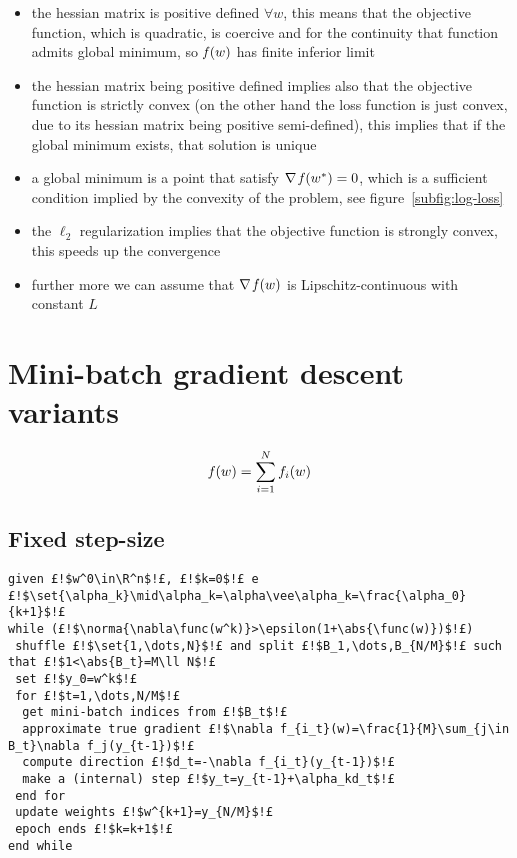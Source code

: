 \begin{itemize}
\item the hessian matrix is positive defined $\forall w$, this means that the objective function, which is quadratic, is coercive and for the continuity that function admits global minimum, so $\operatorname*{\mathit{f}}(w)$ has finite inferior limit
\item the hessian matrix being positive defined implies also that the objective function is strictly convex (on the other hand the loss function is just convex, due to its hessian matrix being positive semi-defined), this implies that if the global minimum exists, that solution is unique
\item a global minimum is a point that satisfy $\nabla\operatorname*{\mathit{f}}(w^\ast)=0$, which is a sufficient condition implied by the convexity of the problem, see figure~\vref{subfig:log-loss}
\item the $\ell_2$ regularization implies that the objective function is strongly convex, this speeds up the convergence
\item further more we can assume that $\nabla\operatorname*{\mathit{f}}(w)$ is Lipschitz-continuous with constant $L$
\end{itemize}


\cleardoublepage
\section{Mini-batch gradient descent variants}

\[
\operatorname*{\mathit{f}}(w)=\sum_{i=1}^Nf_i(w)
\]

\subsection{Fixed step-size}

\begin{lstlisting}[style=simple,title={Mini-batch Gradient Descent with fixed or decreasing step-size}]
given £!$w^0\in\R^n$!£, £!$k=0$!£ e £!$\set{\alpha_k}\mid\alpha_k=\alpha\vee\alpha_k=\frac{\alpha_0}{k+1}$!£
while (£!$\norma{\nabla\func(w^k)}>\epsilon(1+\abs{\func(w)})$!£)
 shuffle £!$\set{1,\dots,N}$!£ and split £!$B_1,\dots,B_{N/M}$!£ such that £!$1<\abs{B_t}=M\ll N$!£
 set £!$y_0=w^k$!£
 for £!$t=1,\dots,N/M$!£
  get mini-batch indices from £!$B_t$!£
  approximate true gradient £!$\nabla f_{i_t}(w)=\frac{1}{M}\sum_{j\in B_t}\nabla f_j(y_{t-1})$!£
  compute direction £!$d_t=-\nabla f_{i_t}(y_{t-1})$!£
  make a (internal) step £!$y_t=y_{t-1}+\alpha_kd_t$!£
 end for
 update weights £!$w^{k+1}=y_{N/M}$!£
 epoch ends £!$k=k+1$!£
end while
\end{lstlisting}

